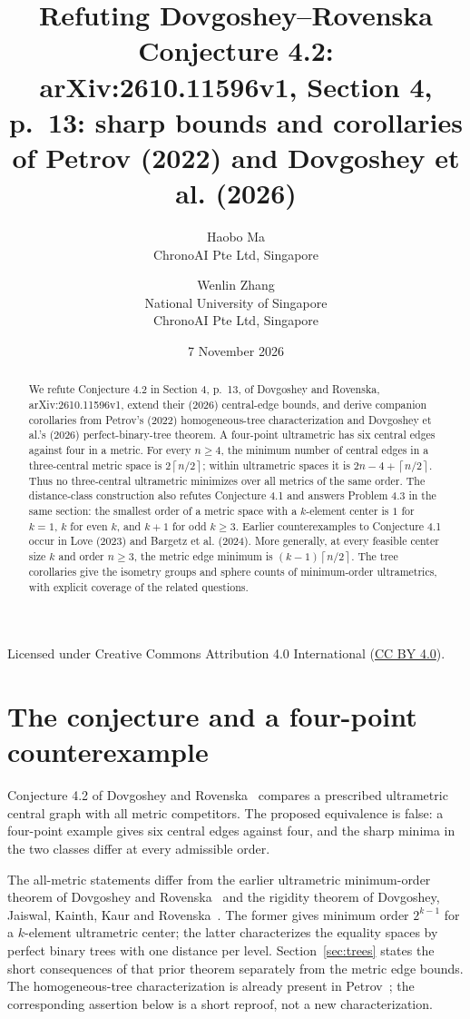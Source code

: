 \documentclass[11pt]{article}
\title{Refuting Dovgoshey--Rovenska Conjecture 4.2:\\
arXiv:2610.11596v1, Section 4, p.~13:
sharp bounds and corollaries of Petrov (2022) and Dovgoshey et al. (2026)}
\author{Haobo Ma\\\small ChronoAI Pte Ltd, Singapore
\and Wenlin Zhang\\\small National University of Singapore\\
\small ChronoAI Pte Ltd, Singapore}
\date{7 November 2026}
\newcommand{\ceil}[1]{\left\lceil #1\right\rceil}
\begin{document}
\maketitle
\begin{abstract}
We refute Conjecture 4.2 in Section 4, p.~13, of Dovgoshey and
Rovenska, arXiv:2610.11596v1, extend their (2026) central-edge bounds,
and derive companion corollaries from Petrov's (2022) homogeneous-tree
characterization and Dovgoshey et al.'s (2026) perfect-binary-tree theorem.
A four-point ultrametric has six central edges against four in a metric.
For every $n\ge4$, the minimum number of central edges in a three-central
metric space is $2\ceil{n/2}$; within ultrametric spaces it is
$2n-4+\ceil{n/2}$.
Thus no three-central ultrametric minimizes over all metrics of the same
order. The distance-class construction also refutes Conjecture 4.1 and
answers Problem 4.3 in the same section: the smallest order of a metric
space with a $k$-element center is $1$ for $k=1$, $k$ for even $k$,
and $k+1$ for odd $k\ge3$.
Earlier counterexamples to Conjecture 4.1 occur in Love (2023) and
Bargetz et al. (2024).
More generally, at every feasible center size $k$ and order $n\ge3$,
the metric edge minimum is $(k-1)\ceil{n/2}$.
The tree corollaries give the isometry groups and sphere counts of
minimum-order ultrametrics, with explicit coverage of the related questions.
\end{abstract}
\noindent\small Licensed under Creative Commons Attribution 4.0 International
(\href{https://creativecommons.org/licenses/by/4.0/}{CC BY 4.0}).\normalsize

\section{The conjecture and a four-point counterexample}
Conjecture 4.2 of Dovgoshey and Rovenska~\cite[Section 4, p.~13]{DR}
compares a prescribed ultrametric central graph with all metric competitors.
The proposed equivalence is false: a four-point example gives six central
edges against four, and the sharp minima in the two classes differ at
every admissible order.

The all-metric statements differ from the earlier ultrametric minimum-order
theorem of Dovgoshey and Rovenska~\cite[Corollary 3.12 and Example 3.13]{UM}
and the rigidity theorem of Dovgoshey, Jaiswal, Kainth, Kaur and
Rovenska~\cite[Theorems 4.1--4.2]{BT}. The former gives minimum order
$2^{k-1}$ for a $k$-element ultrametric center; the latter characterizes
the equality spaces by perfect binary trees with one distance per level.
Section~\ref{sec:trees} states the short consequences of that prior theorem
separately from the metric edge bounds.
The homogeneous-tree characterization is already present in
Petrov~\cite[Theorem 2.2, pp.~6--7]{P}; the corresponding assertion
below is a short reproof, not a new characterization.
\end{document}
